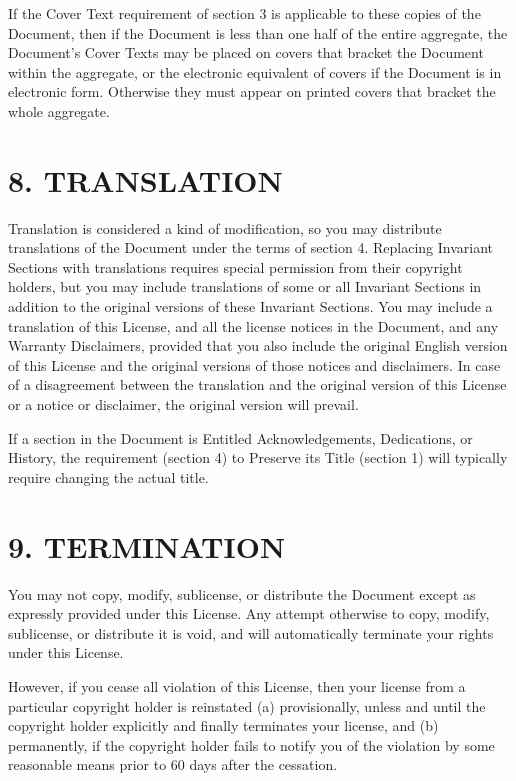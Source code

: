 \documentclass[captions=tableheading]{scrbook}
\begin{document}
\begin{example}
If the Cover Text requirement of section 3 is applicable to these copies of the Document, then if the Document is less than one half of the entire aggregate, the Document's Cover Texts may be placed on covers that bracket the Document within the aggregate, or the electronic equivalent of covers if the Document is in electronic form. Otherwise they must appear on printed covers that bracket the whole aggregate.
\section{8. TRANSLATION}
\label{sec-18-9}


Translation is considered a kind of modification, so you may distribute translations of the Document under the terms of section 4. Replacing Invariant Sections with translations requires special permission from their copyright holders, but you may include translations of some or all Invariant Sections in addition to the original versions of these Invariant Sections. You may include a translation of this License, and all the license notices in the Document, and any Warranty Disclaimers, provided that you also include the original English version of this License and the original versions of those notices and disclaimers. In case of a disagreement between the translation and the original version of this License or a notice or disclaimer, the original version will prevail.

If a section in the Document is Entitled Acknowledgements, Dedications, or History, the requirement (section 4) to Preserve its Title (section 1) will typically require changing the actual title.
\section{9. TERMINATION}
\label{sec-18-10}


You may not copy, modify, sublicense, or distribute the Document except as expressly provided under this License. Any attempt otherwise to copy, modify, sublicense, or distribute it is void, and will automatically terminate your rights under this License.

However, if you cease all violation of this License, then your license from a particular copyright holder is reinstated (a) provisionally, unless and until the copyright holder explicitly and finally terminates your license, and (b) permanently, if the copyright holder fails to notify you of the violation by some reasonable means prior to 60 days after the cessation.


\end{example}
\end{document}
